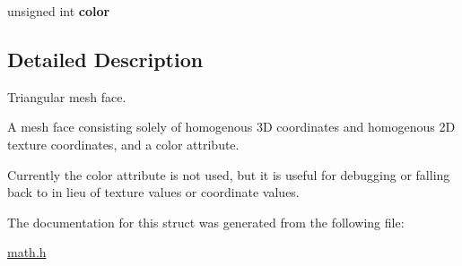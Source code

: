 \begin{DoxyCompactItemize}
\begin{tabbing}
\end{tabbing}\item 
\mbox{\label{structtriangle_a8e59a9188d073130c946f55f3d6f9955}} 
unsigned int {\bfseries color}
\end{DoxyCompactItemize}


\subsection{Detailed Description}
Triangular mesh face. 

A mesh face consisting solely of homogenous 3D coordinates and homogenous 2D texture coordinates, and a color attribute.

Currently the color attribute is not used, but it is useful for debugging or falling back to in lieu of texture values or coordinate values. 

The documentation for this struct was generated from the following file\+:\begin{DoxyCompactItemize}
\item 
\hyperlink{math_8h}{math.\+h}\end{DoxyCompactItemize}
